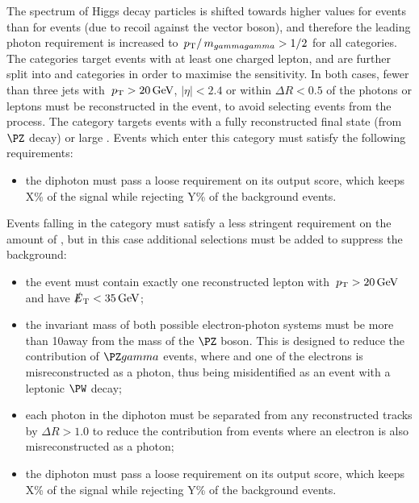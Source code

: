 The \pT spectrum of Higgs decay particles is shifted towards higher values for \VH events than for \ggH events (due to recoil against the vector boson), and therefore the leading photon \pT requirement is increased to $\,p_\text{T}/\,m_{gammagamma} >1/2$ for all \VHTag categories. The \VHLeptonicTag categories target events with at least one charged lepton, and are further split into \VHLooseLeptonicTag and \VHTightLeptonicTag categories in order to maximise the sensitivity. In both cases, fewer than three jets with $\,p_\text{T}>20\,\text{Ge\hspace{-.08em}V}$, $|\eta|<2.4$ or within $\Delta R <0.5$ of the photons or leptons must be reconstructed in the event, to avoid selecting events from the \ttH process. The \VHTightLeptonicTag category targets events with a fully reconstructed final state (from $\PZ$ decay) or large \MET. Events which enter this category must satisfy the following requirements:
\begin{itemize}
\item the diphoton must pass a loose requirement on its \DiPhoBdt output score, which keeps X\% of the signal while rejecting Y\% of the background events.
\end{itemize}

Events falling in the \VHLooseLeptonicTag category must satisfy a less stringent requirement on the amount of \MET, but in this case additional selections must be added to suppress the \SM background:
\begin{itemize}
\item the event must contain exactly one reconstructed lepton with $\,p_\text{T}>20\,\text{Ge\hspace{-.08em}V}$ and have $\slashed{E}_{\mathrm{T}} < 35\,\text{Ge\hspace{-.08em}V}$;
\item the invariant mass of both possible electron-photon systems must be more than 10\GeV away from the mass of the $\PZ$ boson. This is designed to reduce the contribution of $\PZ\gamma$ events, where \Zee and one of the electrons is misreconstructed as a photon, thus being misidentified as an \VH event with a leptonic $\PW$ decay; 
\item each photon in the diphoton must be separated from any reconstructed tracks by $\Delta R >1.0$ to reduce the contribution from \DY events where an electron is also misreconstructed as a photon;
\item the diphoton must pass a loose requirement on its \DiPhoBdt output score, which keeps X\% of the signal while rejecting Y\% of the background events.
\end{itemize}

